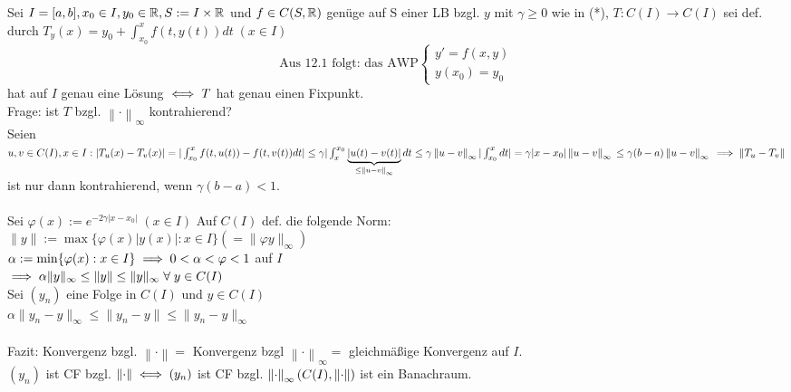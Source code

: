 \documentclass[a4paper,twoside,DIV15,BCOR12mm]{scrbook}
\begin{document}
\begin{vorbetrachtungen}
Sei $I = [a,b] , x_0 \in I, y_0 \in \mathbb{R}, S := I \times \mathbb{R}$ und $f \in C(S,\mathbb{R})$ genüge auf S einer LB bzgl. $y$ mit $\gamma \geq 0$ wie in (*), $T : C(I) \rightarrow C(I)$ sei def. durch $T_y(x) = y_0 + \int_{x_0}^{x}f(t,y(t)) dt \; (x \in I)$ \\
$$ \text{Aus 12.1 folgt: das AWP} \begin{cases} y' = f(x,y) \\ y(x_0) = y_0 \end{cases}$$
hat auf $I$ genau eine Lösung $\iff T$ hat genau einen Fixpunkt. \\
Frage: ist $T$ bzgl. $\left\| \cdot \right\|_{\infty}$ kontrahierend? \\
Seien $u, v \in C(I), x \in I: |T_u(x) - T_v(x)| = |\int_{x_0}^{x}f(t,u(t)) - f(t,v(t)) dt| \\ \leq \gamma |\int_{x}^{x_0} \underbrace{|u(t) - v(t)|}_{\leq \left\|u - v\right\|_{\infty}} dt \leq \gamma \left\|u -v\right\|_\infty |\int_{x_0}^{x} dt| = \gamma|x - x_0| \left\|u - v\right\|_\infty \\ \leq \gamma (b - a)\left\|u - v\right\|_{\infty} \\ \implies \left\|T_u - T_v\right\|$ ist nur dann kontrahierend, wenn $\gamma(b - a) < 1.$ \\\\
Sei $\varphi(x) := e^{-2\gamma|x - x_0|} \; (x \in I)$ Auf $C(I)$ def. die folgende Norm: \\ 
$\|y\| := \max \{\varphi(x) |y(x)| : x \in I\} (= \|\varphi y\|_{\infty})$ \\
$\alpha := \min \{\varphi(x) : x \in I\} \implies 0 < \alpha < \varphi < 1$ auf $I$ \\
$\implies \alpha\|y\|_{\infty} \leq \|y\| \leq \|y\|_{\infty} \; \forall \; y \in C(I)$ \\
Sei $(y_n)$ eine Folge in $C(I)$ und $y \in C(I)$ \\
$\alpha \|y_n - y\|_{\infty} \leq \|y_n - y\| \leq \|y_n - y\|_{\infty}$ \\\\
Fazit: Konvergenz bzgl. $\left\|\cdot\right\| = $ Konvergenz bzgl $\left\|\cdot\right\|_{\infty} = $ gleichmäßige Konvergenz auf $I$. \\
$(y_n)$ ist CF bzgl. $\left\|\cdot\right\| \iff (y_n)$ ist CF bzgl. $\left\|\cdot\right\|_{\infty} \\ (C(I), \left\|\cdot\right\|)$ ist ein Banachraum.  
\end{vorbetrachtungen}
\end{document}
